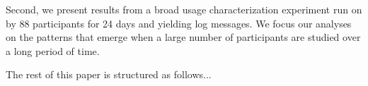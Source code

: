 

Second, we present results from a broad usage characterization experiment run
on \PhoneLab{} by 88 participants for 24 days and yielding  log
messages. We focus our analyses on the patterns that emerge when a large
number of participants are studied over a long period of time. 

The rest of this paper is structured as follows...
